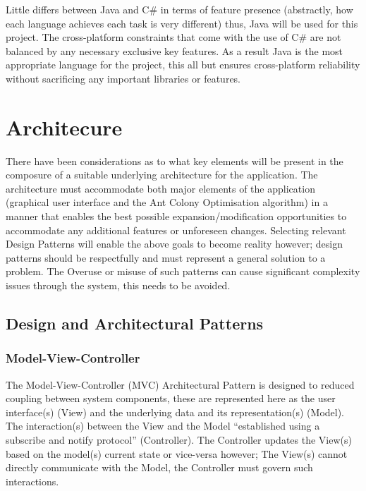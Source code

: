 \documentclass[10pt,a4paper]{article}
\begin{document}
Little differs between Java and C\# in terms of feature presence (abstractly, how each language achieves each task is very different) thus, Java will be used for this project. The cross-platform constraints that come with the use of C\# are not balanced by any necessary exclusive key features. As a result Java is the most appropriate language for the project, this all but ensures cross-platform reliability without sacrificing any important libraries or features.


\section{Architecure}

There have been considerations as to what key elements will be present in the composure of a suitable underlying architecture for the application. The architecture must accommodate both major elements of the application (graphical user interface and the Ant Colony Optimisation algorithm) in a manner that enables the best possible expansion/modification opportunities to accommodate any additional features or unforeseen changes. Selecting relevant Design Patterns will enable the above goals to become reality however; design patterns should be respectfully and must represent a general solution to a problem. The Overuse or misuse of such patterns can cause significant complexity issues through the system, this needs to be avoided. 

\subsection{Design and Architectural Patterns}

\subsubsection{Model-View-Controller}
\label{sssec:mvc}
\label{sec:patternsmvc}
The Model-View-Controller (MVC) Architectural Pattern is designed to reduced coupling between system components, these are represented here as the user interface(s) (View) and the underlying data and its representation(s) (Model). The interaction(s) between the View and the Model \enquote{established using a subscribe and notify protocol}\cite{gof:design:mvc} (Controller). The Controller updates the View(s) based on the model(s) current state or vice-versa however; The View(s) cannot directly communicate with the Model, the Controller must govern such interactions.
\end{document}
